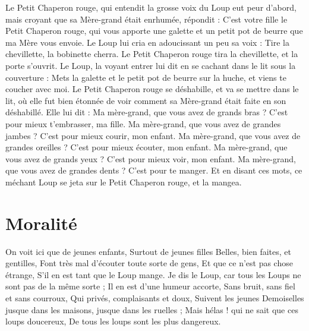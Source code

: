 \documentclass[a4paper,11pt]{article}
\begin{document}
Le Petit Chaperon rouge, qui entendit la grosse voix du Loup eut peur d'abord, mais croyant que sa Mère-grand était enrhumée, répondit : C'est votre fille le Petit Chaperon rouge, qui vous apporte une galette et un petit pot de beurre que ma Mère vous envoie. Le Loup lui cria en adoucissant un peu sa voix : Tire la chevillette, la bobinette cherra. Le Petit Chaperon rouge tira la chevillette, et la porte s'ouvrit. Le Loup, la voyant entrer lui dit en se cachant dans le lit sous la couverture : Mets la galette et le petit pot de beurre sur la huche, et viens te coucher avec moi. Le Petit Chaperon rouge se déshabille, et va se mettre dans le lit, où elle fut bien étonnée de voir comment sa Mère-grand était faite en son déshabillé. Elle lui dit : Ma mère-grand, que vous avez de grands bras ? C'est pour mieux t'embrasser, ma fille. Ma mère-grand, que vous avez de grandes jambes ? C'est pour mieux courir, mon enfant. Ma mère-grand, que vous avez de grandes oreilles ?
C'est pour mieux écouter, mon enfant. Ma mère-grand, que vous avez de grands yeux ? C'est pour mieux voir, mon enfant. Ma mère-grand, que vous avez de grandes dents ? C'est pour te manger. Et en disant ces mots, ce méchant Loup se jeta sur le Petit Chaperon rouge, et la mangea.

\section{Moralité}
On voit ici que de jeunes enfants, Surtout de jeunes filles Belles, bien faites, et gentilles, Font très mal d'écouter toute sorte de gens, Et que ce n'est pas chose étrange, S'il en est tant que le Loup mange.
Je dis le Loup, car tous les Loups ne sont pas de la même sorte ; Il en est d'une humeur accorte, Sans bruit, sans fiel et sans courroux, Qui privés, complaisants et doux, Suivent les jeunes Demoiselles jusque dans les maisons, jusque dans les ruelles ; Mais hélas ! qui ne sait que ces loups doucereux, De tous les loups sont les plus dangereux.
\end{document}
